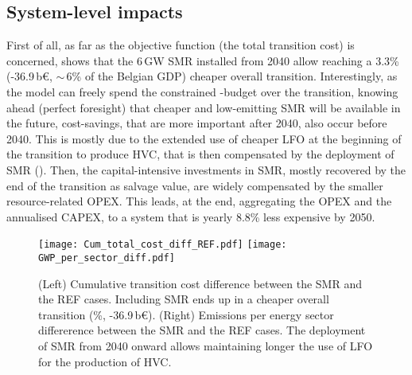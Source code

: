 \subsection{System-level impacts}
\label{subsec:atom_mol:results_deter_overall}
First of all, as far as the objective function (\ie the total transition cost) is concerned,  shows that the 6\,GW \gls{SMR} installed from 2040 allow reaching a 3.3\% (-36.9\,b€, $\sim$\,6\% of the Belgian GDP) cheaper overall transition. Interestingly, as the model can freely spend the constrained -budget over the transition, knowing ahead (\ie perfect foresight) that cheaper and low-emitting \gls{SMR} will be available in the future, cost-savings, that are more important after 2040, also occur before 2040. This is mostly due to the extended use of cheaper \gls{LFO} at the beginning of the transition to produce \gls{HVC}, that is then compensated by the deployment of \gls{SMR} (). Then, the capital-intensive investments in \gls{SMR}, mostly recovered by the end of the transition as salvage value, are widely compensated by the smaller resource-related OPEX. This leads, at the end, aggregating the OPEX and the annualised CAPEX, to a system that is yearly 8.8\% less expensive by 2050.

\begin{figure}[htbp!]
\centering
\texttt{[image: Cum\_total\_cost\_diff\_REF.pdf]}
\texttt{[image: GWP\_per\_sector\_diff.pdf]}
\caption{(Left) Cumulative transition cost difference between the SMR and the REF cases. Including \gls{SMR} ends up in a cheaper overall transition (\%, -36.9\,b€). (Right) Emissions per energy sector differerence between the SMR and the REF cases. The deployment of \gls{SMR} from 2040 onward allows maintaining longer the use of \acrfull{LFO} for the production of \acrfull{HVC}.}
\label{fig:results_deter_overall_emissions_sector}
\end{figure}

